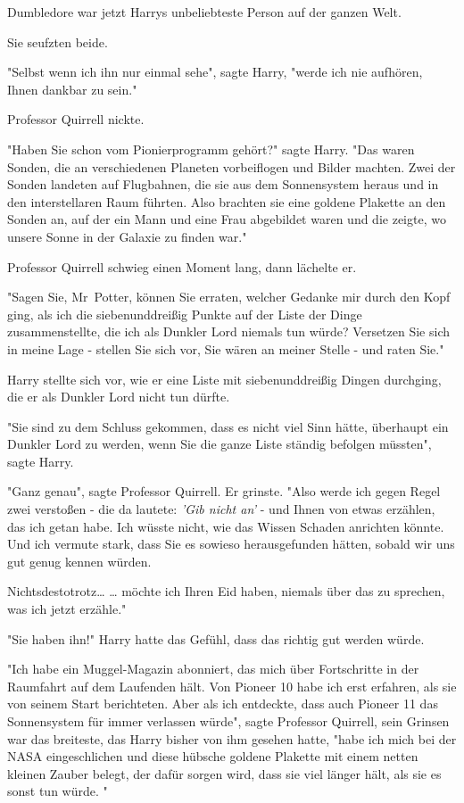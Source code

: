 {Dumbledore war jetzt Harrys unbeliebteste Person auf der ganzen Welt.

Sie seufzten beide.

"Selbst wenn ich ihn nur einmal sehe", sagte Harry, "werde ich nie aufhören, Ihnen dankbar zu sein."

Professor Quirrell nickte.

"Haben Sie schon vom Pionierprogramm gehört?" sagte Harry. "Das waren Sonden, die an verschiedenen Planeten vorbeiflogen und Bilder machten. Zwei der Sonden landeten auf Flugbahnen, die sie aus dem Sonnensystem heraus und in den interstellaren Raum führten. Also brachten sie eine goldene Plakette an den Sonden an, auf der ein Mann und eine Frau abgebildet waren und die zeigte, wo unsere Sonne in der Galaxie zu finden war."

Professor Quirrell schwieg einen Moment lang, dann lächelte er.

"Sagen Sie, Mr~Potter, können Sie erraten, welcher Gedanke mir durch den Kopf ging, als ich die siebenunddreißig Punkte auf der Liste der Dinge zusammenstellte, die ich als Dunkler Lord niemals tun würde? Versetzen Sie sich in meine Lage - stellen Sie sich vor, Sie wären an meiner Stelle - und raten Sie."

Harry stellte sich vor, wie er eine Liste mit siebenunddreißig Dingen durchging, die er als Dunkler Lord nicht tun dürfte.

"Sie sind zu dem Schluss gekommen, dass es nicht viel Sinn hätte, überhaupt ein Dunkler Lord zu werden, wenn Sie die ganze Liste ständig befolgen müssten", sagte Harry.

"Ganz genau", sagte Professor Quirrell. Er grinste. "Also werde ich gegen Regel zwei verstoßen - die da lautete: \emph{'Gib nicht an'} - und Ihnen von etwas erzählen, das ich getan habe. Ich wüsste nicht, wie das Wissen Schaden anrichten könnte. Und ich vermute stark, dass Sie es sowieso herausgefunden hätten, sobald wir uns gut genug kennen würden.

Nichtsdestotrotz… … möchte ich Ihren Eid haben, niemals über das zu sprechen, was ich jetzt erzähle."

"Sie haben ihn!" Harry hatte das Gefühl, dass das richtig gut werden würde.

"Ich habe ein Muggel-Magazin abonniert, das mich über Fortschritte in der Raumfahrt auf dem Laufenden hält. Von Pioneer 10 habe ich erst erfahren, als sie von seinem Start berichteten. Aber als ich entdeckte, dass auch Pioneer 11 das Sonnensystem für immer verlassen würde", sagte Professor Quirrell, sein Grinsen war das breiteste, das Harry bisher von ihm gesehen hatte, "habe ich mich bei der NASA eingeschlichen und diese hübsche goldene Plakette mit einem netten kleinen Zauber belegt, der dafür sorgen wird, dass sie viel länger hält, als sie es sonst tun würde. "

}
